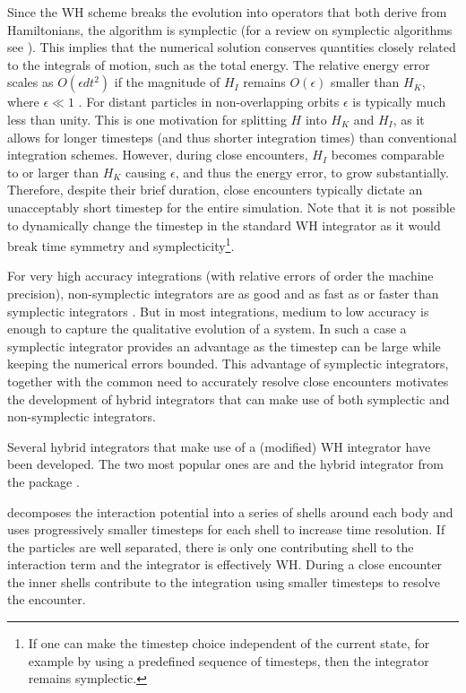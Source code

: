 Since the WH scheme breaks the evolution into operators that both derive from Hamiltonians, the algorithm is symplectic (for a review on symplectic algorithms see \citet{Yoshida1993}).
This implies that the numerical solution conserves quantities closely related to the integrals of motion, such as the total energy. 
The relative energy error scales as $O(\epsilon dt^2)$ if the magnitude of $H_I$ remains $O(\epsilon)$ smaller than $H_K$, where $\epsilon \ll 1$ \citep{Saha1994}. 
For distant particles in non-overlapping orbits $\epsilon$ is typically much less than unity.
This is one motivation for splitting $H$ into $H_K$ and $H_I$, as it allows for longer timesteps (and thus shorter integration times) than conventional integration schemes. 
However, during close encounters, $H_I$ becomes comparable to or larger than $H_K$ causing $\epsilon$, and thus the energy error, to grow substantially. 
Therefore, despite their brief duration, close encounters typically dictate an unacceptably short timestep for the entire simulation. 
Note that it is not possible to dynamically change the timestep in the standard WH integrator as it would break time symmetry and symplecticity\footnote{If one can make the timestep choice independent of the current state, for example by using a predefined sequence of timesteps, then the integrator remains symplectic.}.

For very high accuracy integrations (with relative errors of order the machine precision), non-symplectic integrators are as good and as fast as or faster than symplectic integrators \citep{Rein2015a}.
But in most integrations, medium to low accuracy is enough to capture the qualitative evolution of a system. 
In such a case a symplectic integrator provides an advantage as the timestep can be large while keeping the numerical errors bounded.
This advantage of symplectic integrators, together with the common need to accurately resolve close encounters motivates the development of hybrid integrators that can make use of both symplectic and non-symplectic integrators.

Several hybrid integrators that make use of a (modified) WH integrator have been developed. 
The two most popular ones are \symba \citep{Duncan1998} and the hybrid integrator from the \mercury package \citep[hereafter referred to as \mercury]{Chambers1999}.

\symba decomposes the interaction potential into a series of shells around each body and uses progressively smaller timesteps for each shell to increase time resolution.
If the particles are well separated, there is only one contributing shell to the interaction term and the integrator is effectively WH.
During a close encounter the inner shells contribute to the integration using smaller timesteps to resolve the encounter.

